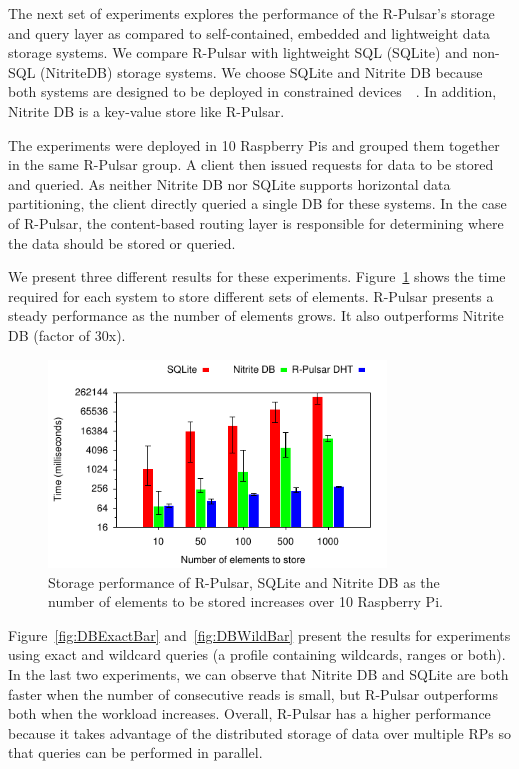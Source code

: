 The next set of experiments explores the performance of the R-Pulsar's storage and query layer as compared to self-contained, embedded and lightweight data storage systems. We compare R-Pulsar with lightweight SQL (SQLite) and non-SQL (NitriteDB) storage systems. We choose SQLite and Nitrite DB because  both systems are designed to be deployed in constrained devices~\cite{sqlite}~\cite{nitrite}. In addition, Nitrite DB is a key-value store like R-Pulsar. 

The experiments were deployed in 10 Raspberry Pis and grouped them together in the same R-Pulsar group. A client then issued requests for data to be stored and queried. As neither Nitrite DB nor SQLite supports horizontal data partitioning, the client directly queried a single DB for these systems. In the case of R-Pulsar, the content-based routing layer is responsible for determining where the data should be stored or queried.

We present three different results for these experiments. Figure~\ref{fig:DBInsertBar} shows the time required for each system to store different sets of elements. R-Pulsar presents a steady performance as the number of elements grows. It also outperforms Nitrite DB (factor of 30x).


\begin{figure}[h!]
  \includegraphics[width=0.8\textwidth]{Results/DBInsertBar}
  \caption{Storage performance of R-Pulsar, SQLite and Nitrite DB as the number of elements to be stored increases over 10 Raspberry Pi.}
  \label{fig:DBInsertBar}
\end{figure}

Figure~\ref{fig:DBExactBar} and~\ref{fig:DBWildBar} present the results for experiments using exact and wildcard queries (a profile containing wildcards, ranges or both).
In the last two experiments, we can observe that Nitrite DB and SQLite are both faster when the number of consecutive reads is small, but R-Pulsar outperforms both when the workload increases. 
Overall, R-Pulsar has a higher performance because it takes advantage of the distributed storage of data over multiple RPs so that queries can be performed in parallel.

